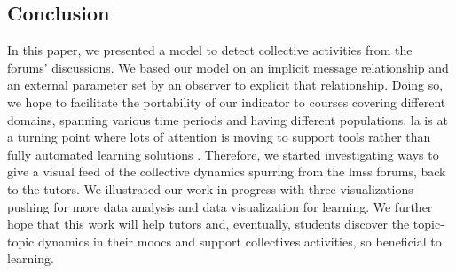 \documentclass[a4paper,twoside]{article}
\begin{document}
\subsection{Conclusion}
In this paper, we presented a model to detect collective activities from the forums' discussions.  We based our model on an implicit message relationship and an external parameter set by an observer to explicit that relationship.  Doing so, we hope to facilitate the portability of our indicator to courses covering different domains, spanning various time periods and having different populations.  %
\gls{la} is at a turning point where lots of attention is moving to support tools rather than fully automated learning solutions \citep{Kone2018,Baker2016}.
Therefore, we started investigating ways to give a visual feed of the collective dynamics spurring from the \glspl{lms} forums, back to the tutors.  We  illustrated our work in progress with three visualizations pushing for more data analysis and data visualization for learning.  We further hope that this work will help tutors and, eventually, students discover the topic-topic dynamics in their \glspl{mooc} and support collectives activities, so beneficial to learning.

\vfill 



\small{}

\vfill
\end{document}
